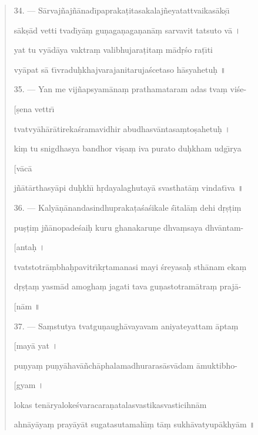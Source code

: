 \documentclass[a4paper, 11pt, oneside, french]{article}
\begin{document}
\begin{quotation}
34. --- S\={a}rvaj\~{n}aj\~{n}\={a}nad\={\i}papraka\d{t}itasakalaj\~{n}eyatattvaikas\={a}k\d{s}\={\i}

s\={a}k\d{s}\={a}d vetti tvad\={\i}y\={a}\d{m} gu\d{n}aga\d{n}aga\d{n}an\={a}\d{m} sarvavit tatsuto v\={a} \texthindi{।}

yat tu vy\={a}d\={a}ya vaktra\d{m} valibhujara\d{t}ita\d{m} m\={a}d\d{r}\'{s}o ra\d{t}\={\i}ti

vy\={a}pat s\={a} t\={\i}vradu\d{h}khajvarajanitaruja\'{s}cetaso h\={a}syahetu\d{h} \texthindi{॥}

\bigskip

35. --- Yan me vij\~{n}apsyam\={a}na\d{m} prathamataram adas tva\d{m} vi\'{s}e-

\hspace*{25mm}[\d{s}ena vettr\={\i}

tvatvy\={a}h\={a}r\={a}tireka\'{s}ramavidhir abudhasv\={a}ntasa\d{m}to\d{s}ahetu\d{h} \texthindi{।}

ki\d{m} tu snigdhasya bandhor vi\d{s}a\d{m} iva purato du\d{h}kham udg\={\i}rya

\hspace*{25mm}[v\={a}c\={a}

j\~{n}\={a}t\={a}rthasy\={a}pi du\d{h}kh\={\i} h\d{r}dayalaghutay\={a} svasthat\={a}\d{m} vindat\={\i}va \texthindi{॥}

\bigskip

36. --- Kaly\={a}\d{n}\={a}nandasindhupraka\d{t}a\'{s}a\'{s}ikale \'{s}\={\i}tal\={a}\d{m} dehi d\d{r}\d{s}\d{t}i\d{m}

pu\d{s}\d{t}i\d{m} j\~{n}\={a}nopade\'{s}ai\d{h} kuru ghanakaru\d{n}e dhva\d{m}saya dhv\={a}ntam-

\hspace*{25mm}[anta\d{h} \texthindi{।}

tvatstotr\={a}\d{m}bha\d{h}pavitr\={\i}k\d{r}tamanasi mayi \'{s}reyasa\d{h} sth\={a}nam eka\d{m}

d\d{r}\d{s}\d{t}a\d{m} yasm\={a}d amogha\d{m} jagati tava gu\d{n}astotram\={a}tra\d{m} praj\={a}-

\hspace*{25mm}[n\={a}m \texthindi{॥}

\bigskip

37. --- Sa\d{m}stutya tvatgu\d{n}augh\={a}vayavam aniyateyattam \={a}pta\d{m}

\hspace*{25mm}[may\={a} yat \texthindi{।}

pu\d{n}ya\d{m} pu\d{n}y\={a}hav\={a}\~{n}ch\={a}phalamadhuraras\={a}sv\={a}dam \={a}muktibho-

\hspace*{25mm}[gyam \texthindi{।}

lokas ten\={a}ryaloke\'{s}varacara\d{n}atalasvastikasvasticihn\={a}m

ahn\={a}y\={a}ya\d{m} pray\={a}y\={a}t sugatasutamah\={\i}\d{m} t\={a}\d{m} sukh\={a}vatyup\={a}khy\={a}m \texthindi{॥}
\end{quotation}
\clearpage
\end{document}
